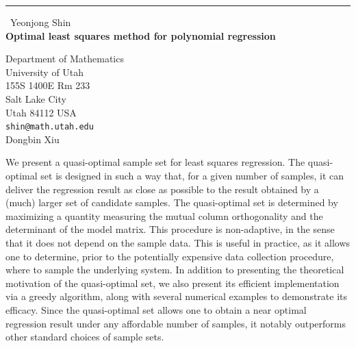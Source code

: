\documentclass{report}
\begin{document}
\begin{center}
\rule{6in}{1pt} \
{\large Yeonjong Shin \\
{\bf Optimal least squares method for polynomial regression}}

Department of Mathematics \\ University of Utah \\ 155S 1400E Rm 233 \\ Salt Lake City \\ Utah 84112 USA
\\
{\tt shin@math.utah.edu}\\
Dongbin Xiu\end{center}

We present a quasi-optimal sample set for least squares regression. The
quasi-optimal set is designed in such a way that, for a given number of
samples, it can deliver the regression result as close as possible to the
result obtained by a (much) larger set of candidate samples. The
quasi-optimal set is determined by maximizing a quantity measuring the
mutual column orthogonality and the determinant of the model matrix. This
procedure is non-adaptive, in the sense that it does not depend on the
sample data. This is useful in practice, as it allows one to determine,
prior to the potentially expensive data collection
procedure, where to sample the underlying system. In addition to
presenting the theoretical motivation of the quasi-optimal set, we also
present its efficient implementation via a greedy algorithm, along with
several numerical examples to demonstrate its efficacy. Since the
quasi-optimal set allows one to obtain a near optimal regression result
under any affordable number of samples, it notably outperforms other
standard choices of sample sets.
\end{document}
